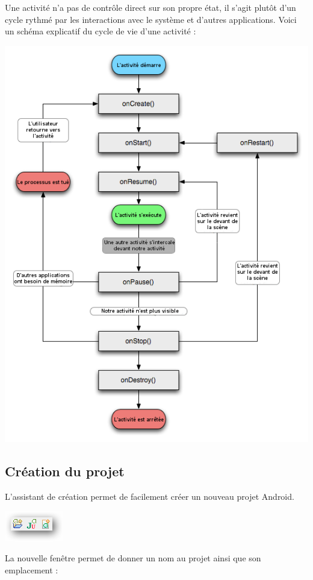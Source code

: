 \documentclass[a4paper]{report}
\begin{document}
			Une activité n'a pas de contrôle direct sur son propre état, il s'agit plutôt d'un cycle rythmé par les interactions avec le système et d'autres applications. Voici un schéma 				explicatif du cycle de vie d’une activité : \\
			\begin{center}
				\includegraphics[scale=0.5]{Images/activ.png}
			\end{center}
			


		\subsection{Création du projet}
			L’assistant de création permet de facilement créer un nouveau projet Android.\\


			\begin{center}
				\includegraphics[scale=0.5]{Images/un.png}
			\end{center}
			La nouvelle fenêtre permet de donner un nom au projet ainsi que son emplacement : \\
\end{document}
